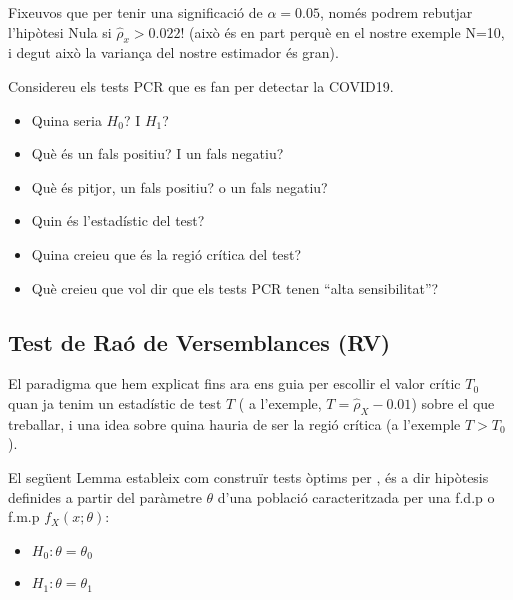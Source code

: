 \documentclass[letterpaper,10pt,english]{sphinxmanual}
\let\sphinxpxdimen\pdfpxdimen\else\newdimen\sphinxpxdimen
\begin{document}
\noindent{\hspace*{\fill}\sphinxincludegraphics[height=280\sphinxpxdimen]{{geom_at_alpha}.png}\hspace*{\fill}}

Fixeu\sphinxhyphen{}vos que per tenir una significació de \(\alpha=0.05\), només podrem
rebutjar l’hipòtesi Nula si \(\hat{\rho}_x > 0.022\)!
(això és en part perquè en el nostre exemple N=10, i degut això la variança del nostre estimador és gran).

Considereu els tests PCR que es fan per detectar la COVID\sphinxhyphen{}19.
\begin{itemize}
\item {} 
Quina seria \(H_0\)? I \(H_1\)?

\item {} 
Què és un fals positiu? I un fals negatiu?

\item {} 
Què és pitjor, un fals positiu? o un fals negatiu?

\item {} 
Quin és l’estadístic del test?

\item {} 
Quina creieu que és la regió crítica del test?

\item {} 
Què creieu que vol dir que els tests PCR tenen “alta sensibilitat”?

\end{itemize}


\subsection{Test de Raó de Versemblances (RV)}
\label{\detokenize{0_Intro/0_4_Tests:test-de-rao-de-versemblances-rv}}
El paradigma que hem explicat fins ara ens guia per escollir
el valor crític \(T_0\) quan ja tenim un estadístic de test \(T\) (
a l’exemple, \(T = \hat{\rho}_X - 0.01\))
sobre el que treballar, i una idea sobre quina hauria de ser
la regió crítica (a l’exemple \(T > T_0\)).

El següent Lemma estableix com construïr tests òptims per , és a dir
hipòtesis definides a partir del paràmetre \(\theta\) d’una població caracteritzada
per una f.d.p o f.m.p  \(f_X(x;\theta)\):
\begin{itemize}
\item {} 
\(H_0: \theta = \theta_0\)

\item {} 
\(H_1: \theta = \theta_1\)

\end{itemize}
\end{document}
